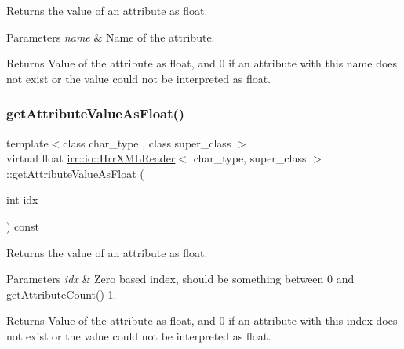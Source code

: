Returns the value of an attribute as float. 


\begin{DoxyParams}{Parameters}
{\em name} & Name of the attribute. \\
\hline
\end{DoxyParams}
\begin{DoxyReturn}{Returns}
Value of the attribute as float, and 0 if an attribute with this name does not exist or the value could not be interpreted as float. 
\end{DoxyReturn}
\mbox{\label{classirr_1_1io_1_1IIrrXMLReader_a3a01b3cec9db01d00928074846d39add}} 
\subsubsection{\texorpdfstring{get\+Attribute\+Value\+As\+Float()}{getAttributeValueAsFloat()}\hspace{0.1cm}{\footnotesize\ttfamily [2/2]}}
{\footnotesize\ttfamily template$<$class char\+\_\+type , class super\+\_\+class $>$ \\
virtual float \hyperlink{classirr_1_1io_1_1IIrrXMLReader}{irr\+::io\+::\+I\+Irr\+X\+M\+L\+Reader}$<$ char\+\_\+type, super\+\_\+class $>$\+::get\+Attribute\+Value\+As\+Float (\begin{DoxyParamCaption}\item[{int}]{idx }\end{DoxyParamCaption}) const\hspace{0.3cm}{\ttfamily [pure virtual]}}



Returns the value of an attribute as float. 


\begin{DoxyParams}{Parameters}
{\em idx} & Zero based index, should be something between 0 and \hyperlink{classirr_1_1io_1_1IIrrXMLReader_a8f85253d2efb15061facdb9571b9c549}{get\+Attribute\+Count()}-\/1. \\
\hline
\end{DoxyParams}
\begin{DoxyReturn}{Returns}
Value of the attribute as float, and 0 if an attribute with this index does not exist or the value could not be interpreted as float. 
\end{DoxyReturn}
\mbox{\label{classirr_1_1io_1_1IIrrXMLReader_ab37bef58865355a7dba0011a38e6c8e7}} 
